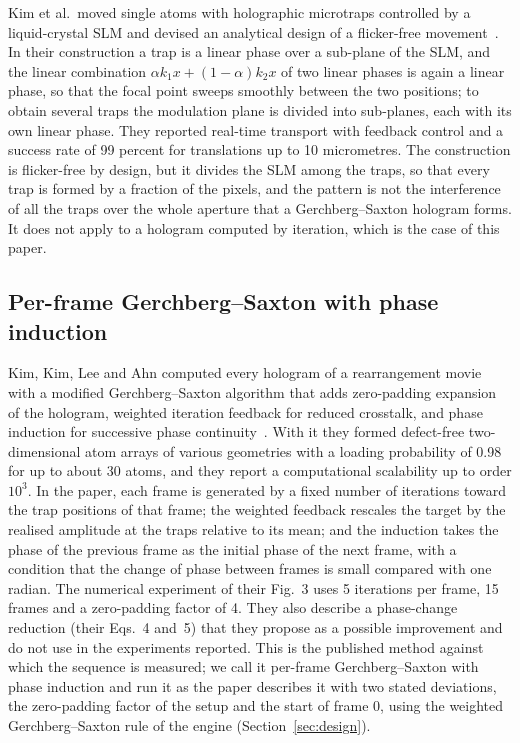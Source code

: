 Kim et al.\ moved single atoms with holographic microtraps controlled by a liquid-crystal SLM and devised an analytical design of a flicker-free movement~\cite{kim2016}. In their construction a trap is a linear phase over a sub-plane of the SLM, and the linear combination $\alpha k_1x+(1-\alpha)k_2x$ of two linear phases is again a linear phase, so that the focal point sweeps smoothly between the two positions; to obtain several traps the modulation plane is divided into sub-planes, each with its own linear phase. They reported real-time transport with feedback control and a success rate of 99 percent for translations up to 10 micrometres. The construction is flicker-free by design, but it divides the SLM among the traps, so that every trap is formed by a fraction of the pixels, and the pattern is not the interference of all the traps over the whole aperture that a Gerchberg--Saxton hologram forms. It does not apply to a hologram computed by iteration, which is the case of this paper.

\subsection{Per-frame Gerchberg--Saxton with phase induction}

Kim, Kim, Lee and Ahn computed every hologram of a rearrangement movie with a modified Gerchberg--Saxton algorithm that adds zero-padding expansion of the hologram, weighted iteration feedback for reduced crosstalk, and phase induction for successive phase continuity~\cite{kimoe}. With it they formed defect-free two-dimensional atom arrays of various geometries with a loading probability of 0.98 for up to about 30 atoms, and they report a computational scalability up to order $10^3$. In the paper, each frame is generated by a fixed number of iterations toward the trap positions of that frame; the weighted feedback rescales the target by the realised amplitude at the traps relative to its mean; and the induction takes the phase of the previous frame as the initial phase of the next frame, with a condition that the change of phase between frames is small compared with one radian. The numerical experiment of their Fig.~3 uses 5 iterations per frame, 15 frames and a zero-padding factor of 4. They also describe a phase-change reduction (their Eqs.~4 and~5) that they propose as a possible improvement and do not use in the experiments reported. This is the published method against which the sequence is measured; we call it per-frame Gerchberg--Saxton with phase induction and run it as the paper describes it with two stated deviations, the zero-padding factor of the setup and the start of frame 0, using the weighted Gerchberg--Saxton rule of the engine (Section~\ref{sec:design}).

